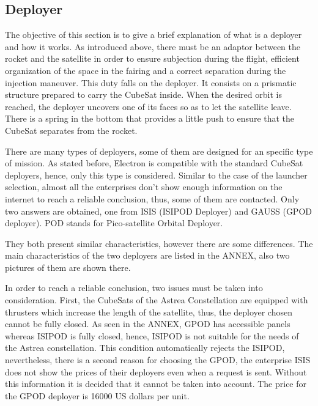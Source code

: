 \subsection{Deployer}
The objective of this section is to give a brief explanation of what is a deployer and how it works. 
As introduced above, there must be an adaptor between the rocket and the satellite in order to ensure subjection during the flight, efficient organization of the space in the fairing and a correct separation during the injection maneuver. This duty falls on the deployer. It consists on a prismatic structure prepared to carry the CubeSat inside. When the desired orbit is reached, the deployer uncovers one of its faces so as to let the satellite leave. There is a spring in the bottom that provides a little push to ensure that the CubeSat separates from the rocket.

There are many types of deployers, some of them are designed for an specific type of mission. As stated before, Electron is compatible with the standard CubeSat deployers, hence, only this type is considered. Similar to the case of the launcher selection, almost all the enterprises don't show enough information on the internet to reach a reliable conclusion, thus, some of them are contacted. Only two answers are obtained, one from ISIS (ISIPOD Deployer) and GAUSS (GPOD deployer). POD stands for Pico-satellite Orbital Deployer. 

They both present similar characteristics, however there are some differences. The main characteristics of the two deployers are listed in the ANNEX, also two pictures of them are shown there.

In order to reach a reliable conclusion, two issues must be taken into consideration. First, the CubeSats of the Astrea Constellation are equipped with thrusters which increase the length of the satellite, thus, the deployer chosen cannot be fully closed. As seen in the ANNEX, GPOD has accessible panels whereas ISIPOD is fully closed, hence, ISIPOD is not suitable for the needs of the Astrea constellation. This condition automatically rejects the ISIPOD, nevertheless, there is a second reason for choosing the GPOD, the enterprise ISIS does not show the prices of their deployers even when a request is sent. Without this information it is decided that it cannot be taken into account. The price for the GPOD  deployer is 16000 US dollars per unit. 